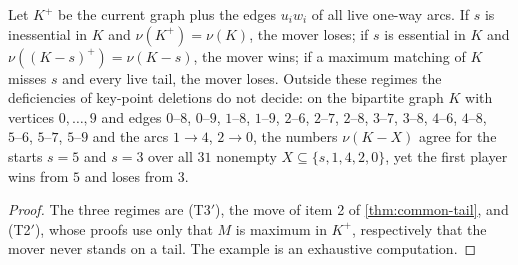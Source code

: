 \begin{proposition}\label{prop:two-arcs}
Let $K^{+}$ be the current graph plus the edges $u_iw_i$ of all live one-way arcs. If $s$ is inessential in $K$ and $\nu(K^{+})=\nu(K)$, the mover loses; if $s$ is essential in $K$ and $\nu((K-s)^{+})=\nu(K-s)$, the mover wins; if a maximum matching of $K$ misses $s$ and every live tail, the mover loses. Outside these regimes the deficiencies of key-point deletions do not decide: on the bipartite graph $K$ with vertices $0,\dots,9$ and edges $0\text{--}8$, $0\text{--}9$, $1\text{--}8$, $1\text{--}9$, $2\text{--}6$, $2\text{--}7$, $2\text{--}8$, $3\text{--}7$, $3\text{--}8$, $4\text{--}6$, $4\text{--}8$, $5\text{--}6$, $5\text{--}7$, $5\text{--}9$ and the arcs $1\to4$, $2\to0$, the numbers $\nu(K-X)$ agree for the starts $s=5$ and $s=3$ over all $31$ nonempty $X\subseteq\{s,1,4,2,0\}$, yet the first player wins from $5$ and loses from $3$.
\end{proposition}
\begin{proof}
The three regimes are (T3$'$), the move of item 2 of \cref{thm:common-tail}, and (T2$'$), whose proofs use only that $M$ is maximum in $K^{+}$, respectively that the mover never stands on a tail. The example is an exhaustive computation.
\end{proof}

